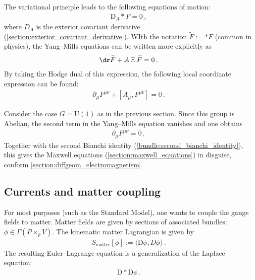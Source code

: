     The variational principle leads to the following equations of motion:
    \begin{gather}
        \label{gauge:YM_equation}
        \mathrm{D}_A\ast F = 0\,,
    \end{gather}
    where $D_A$ is the exterior covariant derivative (\cref{section:exterior_covariant_derivative}). WIth the notation $\widetilde{F}:=\ast F$ (common in physics), the Yang--Mills equations can be written more explicitly as
    \begin{gather}
        \dr\widetilde{F} + A\barwedge\widetilde{F} = 0\,.
    \end{gather}
    By taking the Hodge dual of this expression, the following local coordinate expression can be found:
    \begin{gather}
        \partial_\mu F^{\mu\nu} + [A_\mu,F^{\mu\nu}] = 0\,.
    \end{gather}
    
    \begin{example}[QED]
        Consider the case $G=\mathrm{U}(1)$ as in the previous section. Since this group is Abelian, the second term in the Yang--Mills equation vanishes and one obtains
        \begin{gather}
            \partial_\mu F^{\mu\nu} = 0\,,
        \end{gather}
        Together with the second Bianchi identity (\cref{bundle:second_bianchi_identity}), this gives the Maxwell equations (\cref{section:maxwell_equations}) in disguise, conform \cref{section:diffgeom_electromagnetism}.
    \end{example}


\subsection{Currents and matter coupling}

    For most purposes (such as the Standard Model), one wants to couple the gauge fields to matter. Matter fields are given by sections of associated bundles: $\phi\in\Gamma(P\times_\rho V)$. The kinematic matter Lagrangian is given by
    \begin{gather}
        S_{\text{matter}}[\phi] := \langle\mathrm{D}\phi,D\phi\rangle\,.
    \end{gather}
    The resulting Euler--Lagrange equation is a generalization of the Laplace equation:
    \begin{gather}
        \mathrm{D}\ast\mathrm{D}\phi\,.
    \end{gather}

